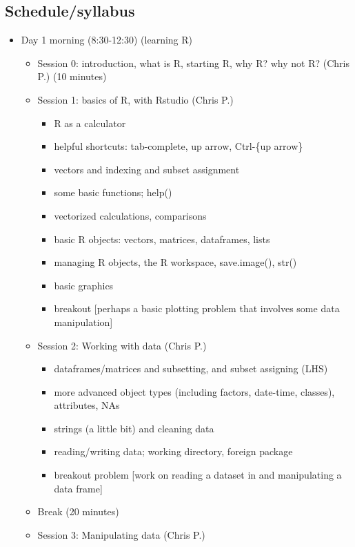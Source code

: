 \documentclass[12pt]{article}\usepackage{graphicx, color}
\begin{document}
\subsection*{Schedule/syllabus}
\begin{itemize}
\item Day 1 morning (8:30-12:30) (learning R)

\begin{itemize}
\item Session 0: introduction, what is R, starting R, why R? why not R?
(Chris P.) (10 minutes)
\item Session 1: basics of R, with Rstudio (Chris P.)

\begin{itemize}
\item R as a calculator
\item helpful shortcuts: tab-complete, up arrow, Ctrl-\{up arrow\}
\item vectors and indexing and subset assignment
\item some basic functions; help()
\item vectorized calculations, comparisons
\item basic R objects: vectors, matrices, dataframes, lists
\item managing R objects, the R workspace, save.image(), str()
\item basic graphics
\item breakout {[}perhaps a basic plotting problem that involves some data
manipulation{]} 
\end{itemize}
\item Session 2: Working with data (Chris P.)

\begin{itemize}
\item dataframes/matrices and subsetting, and subset assigning (LHS)
\item more advanced object types (including factors, date-time, classes),
attributes, NAs
\item strings (a little bit) and cleaning data
\item reading/writing data; working directory, foreign package
\item breakout problem {[}work on reading a dataset in and manipulating
a data frame{]}
\end{itemize}
\item Break (20 minutes)
\item Session 3: Manipulating data (Chris P.)


\end{itemize}
\end{itemize}
\end{document}
